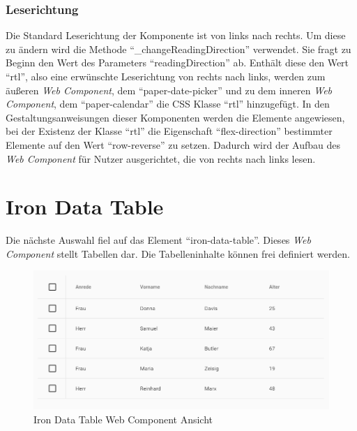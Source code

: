 \documentclass[12pt, paper=a4, bibtotoc, toc=listof, headsepline=true]{scrreprt}
\begin{document}
		\subsubsection{Leserichtung}
		Die Standard Leserichtung der Komponente ist von links nach rechts. Um diese zu ändern wird die Methode \enquote{\_changeReadingDirection} verwendet. Sie fragt zu Beginn den Wert des Parameters \enquote{readingDirection} ab.  Enthält diese den Wert \enquote{rtl}, also eine erwünschte Leserichtung von rechts nach links, werden zum äußeren \emph{Web Component}, dem \enquote{paper-date-picker} und zu dem inneren \emph{Web Component}, dem \enquote{paper-calendar} die \ac{CSS} Klasse \enquote{rtl} hinzugefügt. In den Gestaltungsanweisungen dieser Komponenten werden die Elemente angewiesen, bei der Existenz der Klasse \enquote{rtl} die Eigenschaft \enquote{flex-direction} bestimmter Elemente auf den Wert \enquote{row-reverse} zu setzen. Dadurch wird der Aufbau des \emph{Web Component} für Nutzer ausgerichtet, die von rechts nach links lesen.
		\newpage
		\section{Iron Data Table}
		Die nächste Auswahl fiel auf das Element \enquote{iron-data-table}\cite{saulis}. Dieses \emph{Web Component} stellt Tabellen dar. Die Tabelleninhalte können frei definiert werden.
		\begin{figure}[H]		
			\centering
			\includegraphics[width=\textwidth,height=\textheight,keepaspectratio]{datTab.png}
			\caption[Iron Data Table]{Iron Data Table Web Component Ansicht}
			\label{img:datTab}
		\end{figure}
\end{document}
